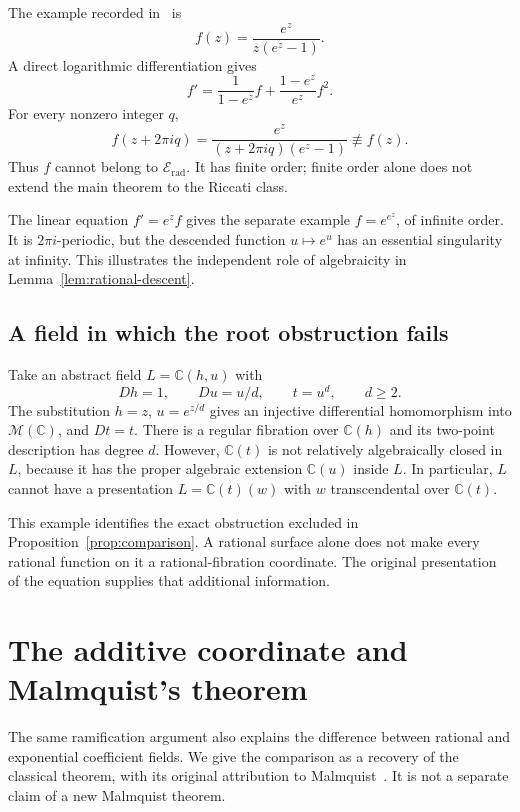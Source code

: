 \documentclass[11pt,reqno]{amsart}
\numberwithin{equation}{section}
\theoremstyle{definition}
\theoremstyle{remark}
\newcommand{\C}{\mathbb C}
\newcommand{\MM}{\mathcal M}
\newcommand{\Erad}{\mathscr E_{\mathrm{rad}}}
\begin{document}
The example recorded in~\cite[Question~6.2]{Gundersen2017} is
\begin{equation}
 f(z)=\frac{e^z}{z(e^z-1)}.
 \label{eq:riccati-counterexample}
\end{equation}
A direct logarithmic differentiation gives
\begin{equation}
 f'=\frac{1}{1-e^z}f+\frac{1-e^z}{e^z}f^2.
 \label{eq:counterexample-riccati}
\end{equation}
For every nonzero integer $q$,
\[
 f(z+2\pi iq)
 =\frac{e^z}{(z+2\pi iq)(e^z-1)}\not\equiv f(z).
\]
Thus $f$ cannot belong to $\Erad$. It has finite order; finite
order alone does not extend the main theorem to the Riccati class.

The linear equation $f'=e^zf$ gives the separate example
$f=e^{e^z}$, of infinite order. It is $2\pi i$-periodic, but the
descended function $u\mapsto e^u$ has an essential singularity at
infinity. This illustrates the independent role of algebraicity
in Lemma~\ref{lem:rational-descent}.

\subsection{A field in which the root obstruction fails}

Take an abstract field $L=\C(h,u)$ with
\[
 Dh=1,\qquad Du=u/d,\qquad t=u^d,
 \qquad d\geq2.
\]
The substitution $h=z$, $u=e^{z/d}$ gives an injective differential
homomorphism into $\MM(\C)$, and $Dt=t$. There is a regular
fibration over $\C(h)$ and its two-point description has degree
$d$. However, $\C(t)$ is not relatively algebraically closed in
$L$, because it has the proper algebraic extension $\C(u)$ inside
$L$. In particular, $L$ cannot have a presentation
$L=\C(t)(w)$ with $w$ transcendental over $\C(t)$.

This example identifies the exact obstruction excluded in
Proposition~\ref{prop:comparison}. A rational surface alone does
not make every rational function on it a rational-fibration
coordinate. The original presentation of the equation supplies
that additional information.

\section{The additive coordinate and Malmquist's theorem}
\label{sec:additive}

The same ramification argument also explains the difference between
rational and exponential coefficient fields. We give the comparison
as a recovery of the classical theorem, with its original attribution
to Malmquist~\cite{Malmquist1913}. It is not a separate claim of a new
Malmquist theorem.
\end{document}
